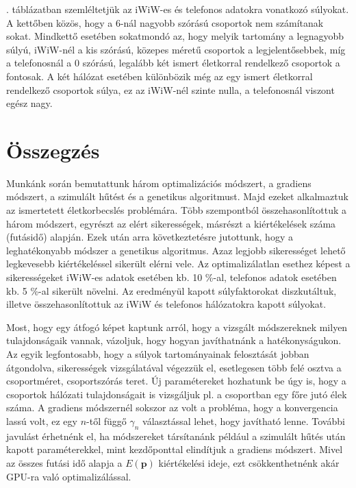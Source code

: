 \documentclass[12pt]{article}
\begin{document}
. táblázatban szemléltetjük az iWiW-es és telefonos adatokra vonatkozó súlyokat. A kettőben közös, hogy a 6-nál nagyobb szórású csoportok nem számítanak sokat. Mindkettő esetében sokatmondó az, hogy melyik tartomány a legnagyobb súlyú, iWiW-nél a kis szórású, közepes méretű csoportok a legjelentősebbek, míg a telefonosnál a 0 szórású, legalább két ismert életkorral rendelkező csoportok a fontosak. %
A két hálózat esetében különbözik még az egy ismert életkorral rendelkező csoportok súlya, ez az iWiW-nél szinte nulla, a telefonosnál viszont egész nagy.

\section{Összegzés}
Munkánk során bemutattunk három optimalizációs módszert, a gradiens módszert, a szimulált hűtést és a genetikus algoritmust. Majd ezeket alkalmaztuk az ismertetett életkorbecslés problémára. Több szempontból összehasonlítottuk a három módszert, egyrészt az elért sikerességek, másrészt a kiértékelések száma (futásidő) alapján. Ezek után arra következtetésre jutottunk, hogy a leghatékonyabb módszer a genetikus algoritmus. Azaz legjobb sikerességet lehető legkevesebb kiértékeléssel sikerült elérni vele.
Az optimalizálatlan esethez képest a sikerességeket iWiW-es adatok esetében kb. 10 \%-al, telefonos adatok esetében kb. 5 \%-al sikerült növelni.
Az eredményül kapott súlyfaktorokat diszkutáltuk, illetve összehasonlítottuk az iWiW és telefonos hálózatokra kapott súlyokat.

Most, hogy egy átfogó képet kaptunk arról, hogy a vizsgált módszereknek milyen tulajdonságaik vannak, vázoljuk, hogy hogyan javíthatnánk a hatékonyságukon. Az egyik legfontosabb, hogy a súlyok tartományainak felosztását jobban átgondolva, sikerességek vizsgálatával végezzük el, esetlegesen több felé osztva a csoportméret, csoportszórás teret. Új paramétereket hozhatunk be úgy is, hogy a csoportok hálózati tulajdonságait is vizsgáljuk pl. a csoportban egy főre jutó élek száma. %
A gradiens módszernél sokszor az volt a probléma, hogy a konvergencia lassú volt, ez egy $n$-től függő $\gamma_n$ választással lehet, hogy javítható lenne.
További javulást érhetnénk el, ha módszereket társítanánk például a szimulált hűtés után kapott paraméterekkel, mint kezdőponttal elindítjuk a gradiens módszert. Mivel az összes futási idő alapja a $E(\mathbf{p})$ kiértékelési ideje, ezt csökkenthetnénk akár GPU-ra való optimalizálással.

\end{document}
